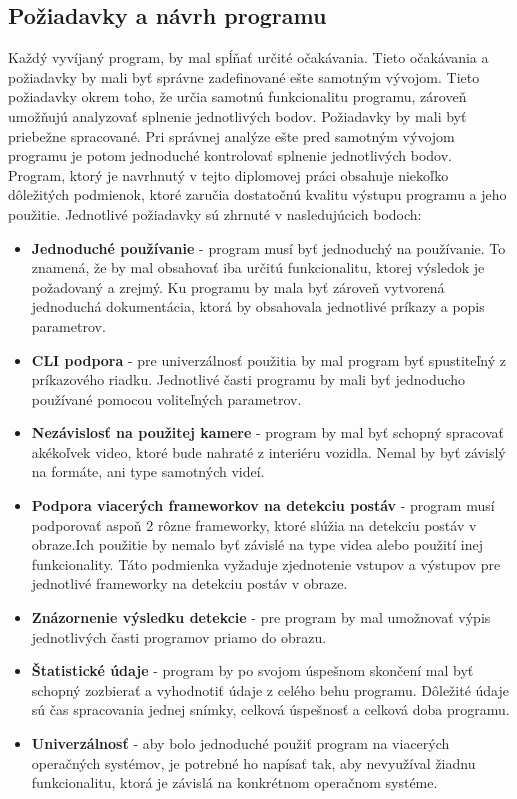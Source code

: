\documentclass[slovak,master,dept460,male,cpp,cpdeclaration]{diploma}
\begin{document}
\subsection{Požiadavky a návrh programu}
Každý vyvíjaný program, by mal  spĺňať určité očakávania. Tieto očakávania a požiadavky by mali byť správne zadefinované ešte samotným vývojom. Tieto požiadavky okrem toho, že určia samotnú funkcionalitu programu, zároveň umožňujú analyzovať splnenie jednotlivých bodov. Požiadavky by mali byť priebežne spracované. Pri správnej analýze ešte pred samotným vývojom programu je potom jednoduché kontrolovať splnenie jednotlivých bodov. Program, ktorý je navrhnutý v tejto diplomovej práci obsahuje niekoľko dôležitých podmienok, ktoré zaručia dostatočnú kvalitu výstupu programu a jeho použitie. Jednotlivé požiadavky sú zhrnuté v nasledujúcich bodoch:
\begin{itemize}
\item \textbf{Jednoduché používanie} - program  musí byť jednoduchý na používanie. To znamená, že by mal obsahovať  iba určitú funkcionalitu, ktorej výsledok je požadovaný a zrejmý. Ku programu by mala byť zároveň vytvorená jednoduchá dokumentácia, ktorá by obsahovala jednotlivé príkazy a popis parametrov.

\item \textbf{CLI podpora} - pre univerzálnosť použitia by mal program byť spustiteľný z príkazového riadku. Jednotlivé časti programu by mali byť jednoducho používané pomocou voliteľných parametrov.

\item \textbf{Nezávislosť na použitej kamere} - program by  mal byť schopný spracovať  akékoľvek video, ktoré bude nahraté z interiéru vozidla. Nemal by byť závislý na formáte, ani type samotných videí.

\item \textbf{Podpora  viacerých frameworkov na detekciu postáv} - program musí podporovať aspoň 2 rôzne frameworky, ktoré slúžia na detekciu postáv v obraze.Ich  použitie by nemalo byť závislé na type videa alebo použití inej funkcionality. Táto podmienka vyžaduje zjednotenie vstupov a výstupov pre jednotlivé frameworky na detekciu postáv v obraze.
\item \textbf{Znázornenie výsledku detekcie} - pre program by mal umožnovať výpis jednotlivých časti programov priamo do obrazu.
\item \textbf{Štatistické údaje} - program by po svojom úspešnom skončení mal byť schopný  zozbierať a vyhodnotiť údaje z celého behu programu. Dôležité údaje sú čas spracovania jednej snímky, celková úspešnosť a celková doba programu. 
\item \textbf{Univerzálnosť} -  aby bolo jednoduché použiť program na viacerých operačných systémov, je potrebné ho napísať tak, aby  nevyužíval žiadnu funkcionalitu, ktorá je závislá na konkrétnom operačnom systéme. 
\end{itemize}
\end{document}
